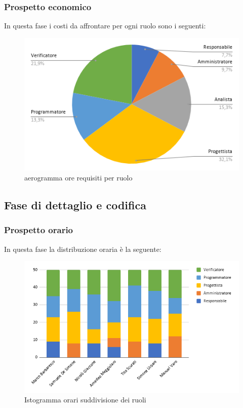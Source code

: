 \subsubsection{Prospetto economico}
In questa fase i costi da affrontare per ogni ruolo sono i seguenti:

\begin{figure}[!h]
    \caption{aerogramma ore requisiti per ruolo}
    \vspace{5px}
    \includegraphics[scale=0.5]{../../../Images/Diagrammi/Diagramma a torta/ore architettura.png}
    \centering
\end{figure}


\subsection{Fase di dettaglio e codifica}
    \subsubsection{Prospetto orario}
    In questa fase la distribuzione oraria è la seguente:
    \begin{figure}[!h]
        \caption{Istogramma orari suddivisione dei ruoli}
        \vspace{5px}
        \includegraphics[scale=0.6]{../../../Images/Diagrammi/Istogrammi/ore codifica.png}
        \centering
    \end{figure}
